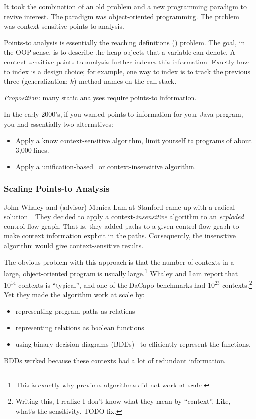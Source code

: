 \documentclass{article}
\begin{document}
It took the combination of an old problem and a new programming paradigm to revive interest.
The paradigm was object-oriented programming.
The problem was context-sensitive points-to analysis.

Points-to analysis is essentially the reaching definitions ({\rd}) problem.
The goal, in the OOP sense, is to describe the heap objects that a variable can denote.
A context-sensitive points-to analysis further indexes this information.
Exactly how to index is a design choice; for example, one way to index is to track the previous three (generalization: $k$) method names on the call stack.

\emph{Proposition:} many static analyses require points-to information.

In the early 2000's, if you wanted points-to information for your Java program, you had essentially two alternatives:
\begin{itemize}
\item Apply a know context-sensitive algorithm, limit yourself to programs of about 3,000 lines.
\item Apply a unification-based~\cite{s-popl-1995} or context-insensitive algorithm.
\end{itemize}


\subsubsection*{Scaling Points-to Analysis}

John Whaley and (advisor) Monica Lam at Stanford came up with a radical solution~\cite{wl-pldi-2004}.
They decided to apply a context-\emph{insensitive} algorithm to an \emph{exploded} control-flow graph.
That is, they added paths to a given control-flow graph to make context information explicit in the paths.
Consequently, the insensitive algorithm would give context-sensitive results.

The obvious problem with this approach is that the number of contexts in a large, object-oriented program is usually large.\footnote{This is exactly why previous algorithms did not work at scale.}
Whaley and Lam report that $10^{14}$ contexts is ``typical'', and one of the DaCapo benchmarks had $10^{23}$ contexts.\footnote{Writing this, I realize I don't know what they mean by ``context''. Like, what's the sensitivity. TODO fix.}
Yet they made the algorithm work at scale by:
\begin{itemize}
\item representing program paths as relations
\item representing relations as boolean functions
\item using binary decision diagrams (BDDs)~\cite{a-ieee-1978} to efficiently represent the functions.
\end{itemize}
\noindent BDDs worked because these contexts had a lot of redundant information.
\end{document}

